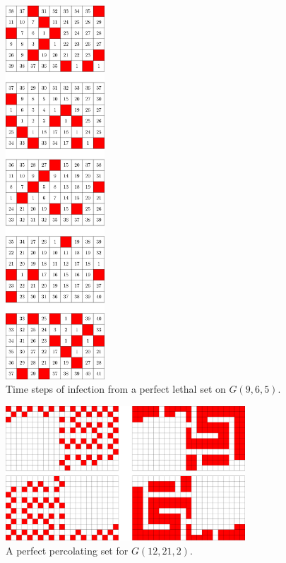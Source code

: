 \begin{figure}[H]
\centering
\includegraphics[width=0.33\textwidth]{figures/A/6x9x5_numbered_heatmap.pdf}
\caption{Time steps of infection from a perfect lethal set on $G(9,6,5)$.}
\label{fig:6x9x5_numbered_heatmap}
\end{figure}

\newpage


\begin{figure}[H]
\centering
\includegraphics[width=0.8\textwidth]{figures/7/12x21x2.pdf}
\caption{A perfect percolating set for $G(12,21,2)$.}
\label{fig:12x21x2}
\end{figure} 

